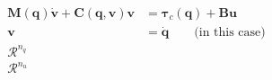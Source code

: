 \documentclass[preview]{standalone}
\newcommand{\bs}{\boldsymbol}
\newcommand{\vs}[1]{{\bs{#1}}}
\newcommand{\ms}[1]{{\bs{#1}}}
\newcommand{\vq}{\vs{q}}
\newcommand{\vv}{\vs{v}}
\newcommand{\vu}{\vs{u}}
\newcommand{\mM}{\ms{M}}
\newcommand{\mC}{\ms{C}}
\newcommand{\vtauc}{\vs{\tau}_c}
\newcommand{\mB}{\ms{B}}
\begin{document}
\begin{align*}
    \mM(\vq) \dot{\vv} + \mC(\vq, \vv) \vv &= \vtauc(\vq) + \mB \vu \\
    \vv &= \dot{\vq} \hspace{2em} \text{(in this case)} \\
    \mathcal{R}^{n_q}  \\
    \mathcal{R}^{n_u}
\end{align*}
\end{document}
